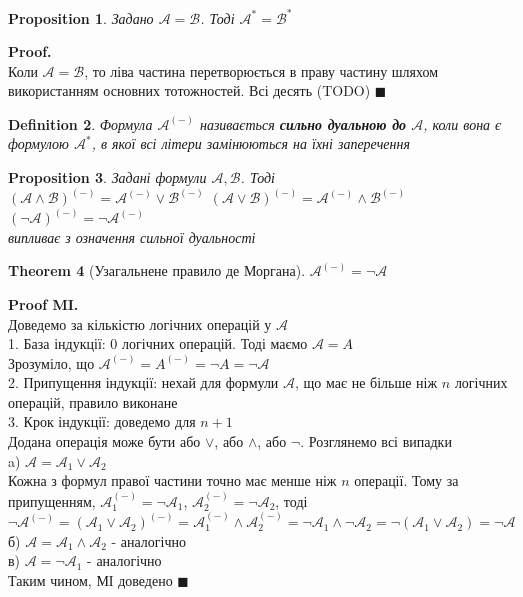 \documentclass[a4paper, 14pt]{extarticle}
\theoremstyle{theoremdd}
\newtheorem{theorem}{Theorem}[subsection]
\theoremstyle{theoremdd}
\newtheorem{definition}[theorem]{Definition}
\theoremstyle{theoremdd}
\theoremstyle{theoremdd}
\theoremstyle{theoremdd}
\newtheorem{proposition}[theorem]{Proposition}
\theoremstyle{theoremdd}
\theoremstyle{theoremdd}
\theoremstyle{theoremdd}
\newenvironment{pf}{\vspace*{-3mm} \textbf{Proof. \\}}{$\blacksquare$}
\newenvironment{pfMI}{\vspace*{-3mm} \textbf{Proof MI. \\}}{$\blacksquare$}
\begin{document}
\begin{proposition}
Задано $\mathcal{A} = \mathcal{B}$. Тоді $\mathcal{A}^* = \mathcal{B}^*$
\end{proposition}

\begin{pf}
Коли $\mathcal{A} = \mathcal{B}$, то ліва частина перетворюється в праву частину шляхом використанням основних тотожностей. Всі десять (TODO) 
\end{pf}

\begin{definition}
Формула $\mathcal{A}^{(-)}$ називається \textbf{сильно дуальною до} $\mathcal{A}$, коли вона є формулою $\mathcal{A}^{*}$, в якої всі літери замінюються на їхні заперечення
\end{definition}

\begin{proposition}
Задані формули $\mathcal{A}, \mathcal{B}$. Тоді\\
$(\mathcal{A} \wedge \mathcal{B})^{(-)} = \mathcal{A}^{(-)} \vee \mathcal{B}^{(-)}$ \hspace{0.5cm} $(\mathcal{A} \vee \mathcal{B})^{(-)} = \mathcal{A}^{(-)} \wedge \mathcal{B}^{(-)}$ \hspace{0.5cm} $(\neg \mathcal{A})^{(-)} = \neg \mathcal{A}^{(-)}$\\
\textit{випливає з означення сильної дуальності}
\end{proposition}

\begin{theorem}[Узагальнене правило де Моргана]
$\mathcal{A}^{(-)} = \neg \mathcal{A}$
\end{theorem}

\begin{pfMI}
Доведемо за кількістю логічних операцій у $\mathcal{A}$\\
1. База індукції: 0 логічних операцій. Тоді маємо $\mathcal{A} = A$\\
Зрозуміло, що $\mathcal{A}^{(-)} = A^{(-)} = \neg A = \neg \mathcal{A}$\\
2. Припущення індукції: нехай для формули $\mathcal{A}$, що має не більше ніж $n$ логічних операцій, правило виконане\\
3. Крок індукції: доведемо для $n+1$\\
Додана операція може бути або $\vee$, або $\wedge$, або $\neg$. Розглянемо всі випадки\\
a) $\mathcal{A} = \mathcal{A}_1 \vee \mathcal{A}_2$\\
Кожна з формул правої частини точно має менше ніж $n$ операції. Тому за припущенням, $\mathcal{A}_1^{(-)} = \neg \mathcal{A}_1$, $\mathcal{A}_2^{(-)} = \neg \mathcal{A}_2$, тоді\\
$\neg \mathcal{A}^{(-)} = (\mathcal{A}_1 \vee \mathcal{A}_2)^{(-)} = \mathcal{A}_1^{(-)} \wedge \mathcal{A}_2^{(-)} = \neg \mathcal{A}_1 \wedge \neg \mathcal{A}_2 = \neg (\mathcal{A}_1 \vee \mathcal{A}_2) = \neg \mathcal{A}$\\
б) $\mathcal{A} = \mathcal{A}_1 \wedge \mathcal{A}_2$ - аналогічно\\
в) $\mathcal{A} = \neg \mathcal{A}_1$ - аналогічно\\
Таким чином, МІ доведено
\end{pfMI}
\end{document}
